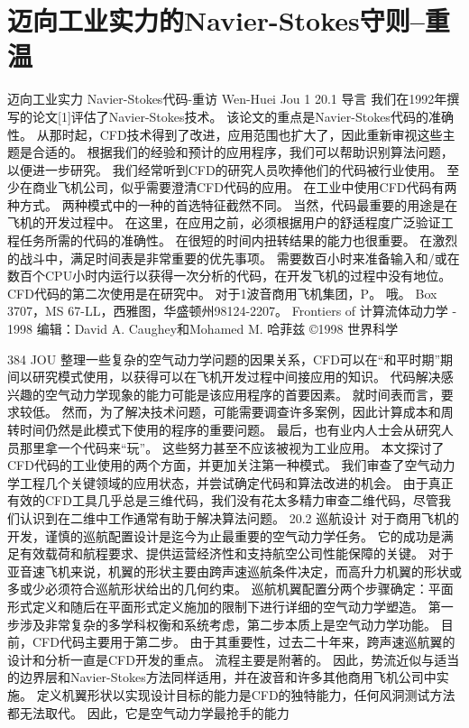 \documentclass[UTF8,11pt,a4paper,openany,fontset=fandol]{ctexbook}
\begin{document}
\chapter{迈向工业实力的Navier-Stokes守则--重温}
迈向工业实力 Navier-Stokes代码-重访 Wen-Huei Jou 1 20.1 导言 我们在1992年撰写的论文[1]评估了Navier-Stokes技术。 该论文的重点是Navier-Stokes代码的准确性。 从那时起，CFD技术得到了改进，应用范围也扩大了，因此重新审视这些主题是合适的。 根据我们的经验和预计的应用程序，我们可以帮助识别算法问题，以便进一步研究。 我们经常听到CFD的研究人员吹捧他们的代码被行业使用。 至少在商业飞机公司，似乎需要澄清CFD代码的应用。 在工业中使用CFD代码有两种方式。 两种模式中的一种的首选特征截然不同。 当然，代码最重要的用途是在飞机的开发过程中。 在这里，在应用之前，必须根据用户的舒适程度广泛验证工程任务所需的代码的准确性。 在很短的时间内扭转结果的能力也很重要。 在激烈的战斗中，满足时间表是非常重要的优先事项。 需要数百小时来准备输入和/或在数百个CPU小时内运行以获得一次分析的代码，在开发飞机的过程中没有地位。 CFD代码的第二次使用是在研究中。 对于1波音商用飞机集团，P。 哦。 Box 3707，MS 67-LL，西雅图，华盛顿州98124-2207。 Frontiers of 计算流体动力学 - 1998 编辑：David A. Caughey和Mohamed M. 哈菲兹 ©1998 世界科学

384 JOU 整理一些复杂的空气动力学问题的因果关系，CFD可以在“和平时期”期间以研究模式使用，以获得可以在飞机开发过程中间接应用的知识。 代码解决感兴趣的空气动力学现象的能力可能是该应用程序的首要因素。 就时间表而言，要求较低。 然而，为了解决技术问题，可能需要调查许多案例，因此计算成本和周转时间仍然是此模式下使用的程序的重要问题。 最后，也有业内人士会从研究人员那里拿一个代码来“玩”。 这些努力甚至不应该被视为工业应用。 本文探讨了CFD代码的工业使用的两个方面，并更加关注第一种模式。 我们审查了空气动力学工程几个关键领域的应用状态，并尝试确定代码和算法改进的机会。 由于真正有效的CFD工具几乎总是三维代码，我们没有花太多精力审查二维代码，尽管我们认识到在二维中工作通常有助于解决算法问题。 20.2 巡航设计 对于商用飞机的开发，谨慎的巡航配置设计是迄今为止最重要的空气动力学任务。 它的成功是满足有效载荷和航程要求、提供运营经济性和支持航空公司性能保障的关键。 对于亚音速飞机来说，机翼的形状主要由跨声速巡航条件决定，而高升力机翼的形状或多或少必须符合巡航形状给出的几何约束。 巡航机翼配置分两个步骤确定：平面形式定义和随后在平面形式定义施加的限制下进行详细的空气动力学塑造。 第一步涉及非常复杂的多学科权衡和系统考虑，第二步本质上是空气动力学功能。 目前，CFD代码主要用于第二步。 由于其重要性，过去二十年来，跨声速巡航翼的设计和分析一直是CFD开发的重点。 流程主要是附著的。 因此，势流近似与适当的边界层和Navier-Stokes方法同样适用，并在波音和许多其他商用飞机公司中实施。 定义机翼形状以实现设计目标的能力是CFD的独特能力，任何风洞测试方法都无法取代。 因此，它是空气动力学最抢手的能力
\end{document}
